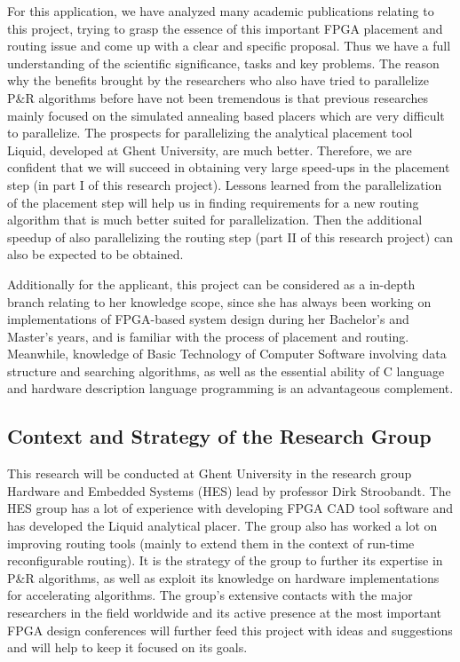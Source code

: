 \documentclass[a4paper,oneside,12pt]{article}
\begin{document}
For this application, we have analyzed many academic publications relating to this project, trying to grasp the essence of this important FPGA placement and routing issue and come up with a clear and specific proposal. Thus we have a full understanding of the scientific significance, tasks and key problems. The reason why the benefits brought by the researchers who also have tried to parallelize P\&R algorithms before have not been tremendous is that previous researches mainly focused on the simulated annealing based placers which are very difficult to parallelize. The prospects for parallelizing the analytical placement tool {\sc Liquid}, developed at Ghent University, are much better. Therefore, we are confident that we will succeed in obtaining very large speed-ups in the placement step (in part I of this research project). Lessons learned from the parallelization of the placement step will help us in finding requirements for a new routing algorithm that is much better suited for parallelization. Then the additional speedup of also parallelizing the routing step (part II of this research project) can also be expected to be obtained.

Additionally for the applicant, this project can be considered as a in-depth branch relating to her knowledge scope, since she has always been working on implementations of FPGA-based system design during her Bachelor's and Master's years, and is familiar with the process of placement and routing. Meanwhile, knowledge of Basic Technology of Computer Software involving data structure and searching algorithms, as well as the essential ability of C language and hardware description language programming is an advantageous complement.

\subsection{Context and Strategy of the Research Group}\label{context}
This research will be conducted at Ghent University in the research group Hardware and Embedded Systems (HES) lead by professor Dirk Stroobandt. The HES group has a lot of experience with developing FPGA CAD tool software and has developed the {\sc Liquid} analytical placer. The group also has worked a lot on improving routing tools (mainly to extend them in the context of run-time reconfigurable routing). It is the strategy of the group to further its expertise in P\&R algorithms, as well as exploit its knowledge on hardware implementations for accelerating algorithms. The group's extensive contacts with the major researchers in the field worldwide and its active presence at the most important FPGA design conferences will further feed this project with ideas and suggestions and will help to keep it focused on its goals.
\end{document}
